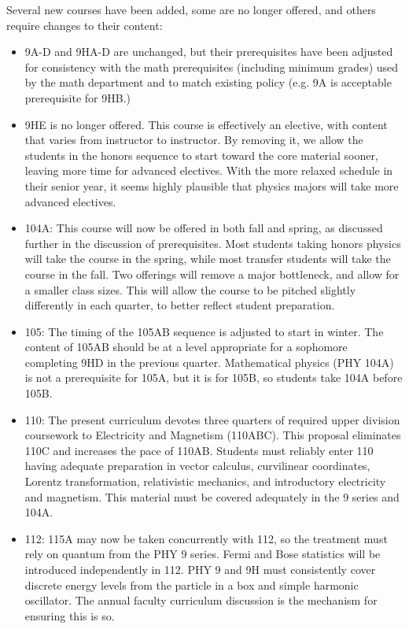 \documentclass[12pt]{article}
\begin{document}
\vskip 2cm
Several new courses have been added, some are no longer offered, and
others require changes to their content:
\begin{itemize}

\item 9A-D and 9HA-D are unchanged, but their prerequisites have been
  adjusted for consistency with the math prerequisites (including
  minimum grades) used by the math department and to match existing
  policy (e.g. 9A is acceptable prerequisite for 9HB.)

\item 9HE is no longer offered.  This course is effectively an
  elective, with content that varies from instructor to instructor.
  By removing it, we allow the students in the honors sequence to
  start toward the core material sooner, leaving more time for
  advanced electives. With the more relaxed schedule in their senior
  year, it seems highly plausible that physics majors will take more
  advanced electives.

\item 104A: This course will now be offered in both fall and spring,
  as discussed further in the discussion of prerequisites.  Most
  students taking honors physics will take the course in the spring,
  while most transfer students will take the course in the fall.  Two
  offerings will remove a major bottleneck, and allow for a smaller class
  sizes.  This will allow the course to be
  pitched slightly differently in each quarter, to better reflect
  student preparation.

\item 105: The timing of the 105AB sequence is adjusted to start in
  winter.  The content of 105AB should be at a level appropriate for a
  sophomore completing 9HD in the previous quarter.  Mathematical
  physics (PHY 104A) is not a prerequisite for 105A, but it is for
  105B, so students take 104A before 105B.

\item 110: The present curriculum devotes three quarters of required
  upper division coursework to Electricity and Magnetism (110ABC).
  This proposal eliminates 110C and increases the pace of 110AB.
  Students must reliably enter 110 having adequate preparation in
  vector calculus, curvilinear coordinates, Lorentz transformation,
  relativistic mechanics, and introductory electricity and magnetism.
  This material must be covered adequately in the 9 series and 104A.

\item 112: 115A may now be taken concurrently with 112, so the
  treatment must rely on quantum from the PHY 9 series.  Fermi
  and Bose statistics will be introduced independently in 112.  PHY 9
  and 9H must consistently cover discrete energy levels from the
  particle in a box and simple harmonic oscillator.  The annual
  faculty curriculum discussion is the mechanism for ensuring this is
  so.
    

\end{itemize}
\end{document}
